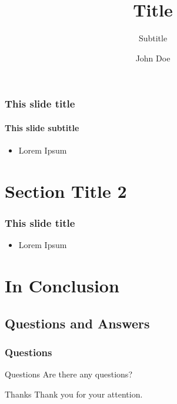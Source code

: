 \documentclass[english,hyperref={pdfpagelabels=false}]{beamer}
\title{Title}
\subtitle{Subtitle}
\author{John Doe} %
\institute[Bonn-Rhein-Sieg University of Applied Sciences]{Bonn-Rhein-Sieg University of Applied Sciences}
\date{\date{}}
\begin{document}
\begin{frame}
    \titlepage
\end{frame}

\begin{frame}
    \tableofcontents
\end{frame}


\begin{frame}
    \frametitle{This slide title}
    \framesubtitle{This slide subtitle}
    \begin{itemize}
        \item Lorem Ipsum
    \end{itemize}
\end{frame}

\section{Section Title 2}

\begin{frame}
    \frametitle{This slide title}
    \begin{itemize}
        \item Lorem Ipsum
    \end{itemize}
\end{frame}

\section{In Conclusion}
\subsection{Questions and Answers}
\begin{frame}
    \frametitle{Questions}
    \begin{block}{Questions}
        Are there any questions?
    \end{block}
    \pause
    \begin{block}{Thanks}
        Thank you for your attention.
    \end{block}
\end{frame}
\end{document}
